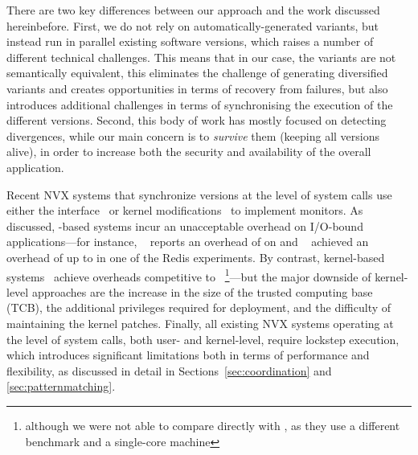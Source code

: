 There are two key differences between our approach and the work discussed
hereinbefore.  First, we do not rely on automatically-generated variants, but
instead run in parallel existing software versions, which raises a number of
different technical challenges.  This means that in our case, the variants are
not semantically equivalent, this eliminates the challenge of generating
diversified variants and creates opportunities in terms of recovery from
failures, but also introduces additional challenges in terms of synchronising
the execution of the different versions.  Second, this body of work has mostly
focused on detecting divergences, while our main concern is to \textit{survive}
them (keeping all versions alive), in order to increase both the security and
availability of the overall application.


Recent NVX systems that synchronize versions at the level of system
calls use either the \ptrace interface~\cite{orchestra09,tachyon12}
or kernel modifications~\cite{cox2006} to implement monitors.  As
discussed, -based systems incur an unacceptable overhead
on I/O-bound applications---for instance, \tachyon~\cite{tachyon12}
reports an overhead of \tachyonLighttpd on \lighttpd and \mx~\cite{mx}
achieved an overhead of up to \mxRedis in one of the Redis
experiments.  By contrast, kernel-based systems~\cite{cox2006} achieve
overheads competitive to \varan~\footnote{although we were not able to compare
directly with \cite{cox2006}, as they use a different benchmark and a
single-core machine}---but the major downside of kernel-level approaches are
the increase in the size of the trusted computing base (TCB), the additional
privileges required for deployment, and the difficulty of maintaining the
kernel patches.  Finally, all existing NVX systems operating at the level of
system calls, both user- and kernel-level, require lockstep execution, which
introduces significant limitations both in terms of performance and
flexibility, as discussed in detail in Sections~\ref{sec:coordination} and
\ref{sec:patternmatching}.

